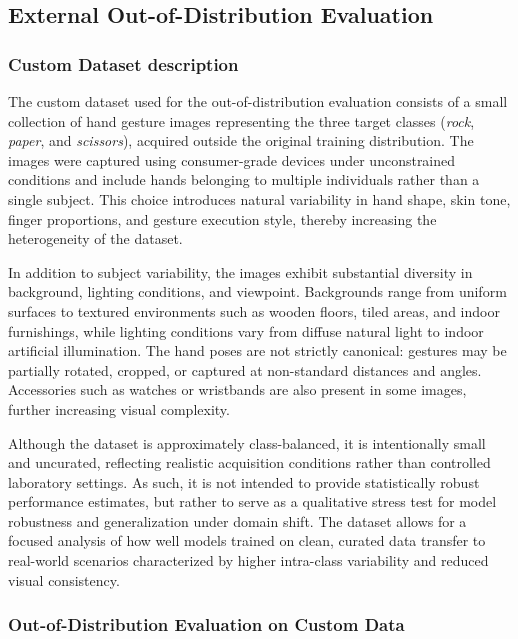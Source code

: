 \documentclass{article}
\begin{document}
\subsection{External Out-of-Distribution Evaluation}
\subsubsection{Custom Dataset description}

The custom dataset used for the out-of-distribution evaluation consists
of a small collection of hand gesture images representing the three
target classes (\emph{rock}, \emph{paper}, and \emph{scissors}),
acquired outside the original training distribution. The images were
captured using consumer-grade devices under unconstrained conditions and
include hands belonging to multiple individuals rather than a single
subject. This choice introduces natural variability in hand shape, skin
tone, finger proportions, and gesture execution style, thereby
increasing the heterogeneity of the dataset.

In addition to subject variability, the images exhibit substantial
diversity in background, lighting conditions, and viewpoint. Backgrounds
range from uniform surfaces to textured environments such as wooden
floors, tiled areas, and indoor furnishings, while lighting conditions
vary from diffuse natural light to indoor artificial illumination. The
hand poses are not strictly canonical: gestures may be partially
rotated, cropped, or captured at non-standard distances and angles.
Accessories such as watches or wristbands are also present in some
images, further increasing visual complexity.

Although the dataset is approximately class-balanced, it is
intentionally small and uncurated, reflecting realistic acquisition
conditions rather than controlled laboratory settings. As such, it is
not intended to provide statistically robust performance estimates, but
rather to serve as a qualitative stress test for model robustness and
generalization under domain shift. The dataset allows for a focused
analysis of how well models trained on clean, curated data transfer to
real-world scenarios characterized by higher intra-class variability and
reduced visual consistency.

\subsubsection{Out-of-Distribution Evaluation on Custom Data}
\end{document}
